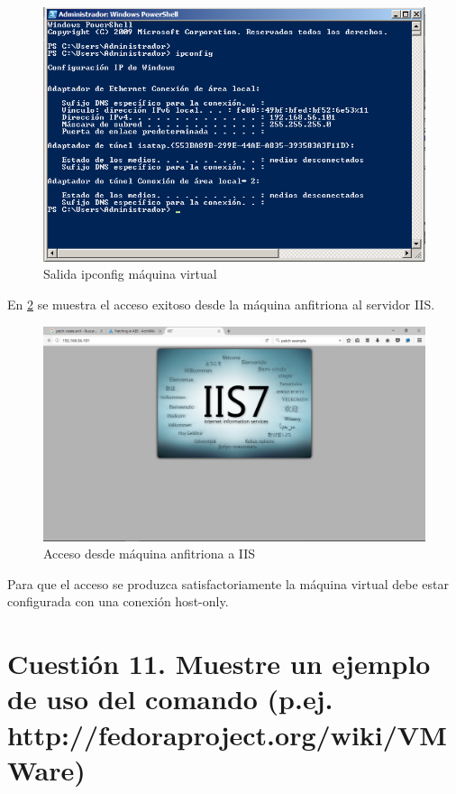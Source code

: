 \begin{figure}[H]
	\centering
	\includegraphics[scale=0.6]{ise20.png}
	\caption{Salida ipconfig máquina virtual} \label{ise20}
\end{figure}

En \ref{ise19} se muestra el acceso exitoso desde la máquina anfitriona al servidor IIS.

\begin{figure}[H]
	\centering
	\includegraphics[scale=0.45]{ise19.png}
	\caption{Acceso desde máquina anfitriona a IIS} \label{ise19}
\end{figure}

Para que el acceso se produzca satisfactoriamente la máquina virtual debe estar configurada con una conexión host-only.

\section{Cuestión 11. Muestre un ejemplo de uso del comando (p.ej. http://fedoraproject.org/wiki/VMWare)}

